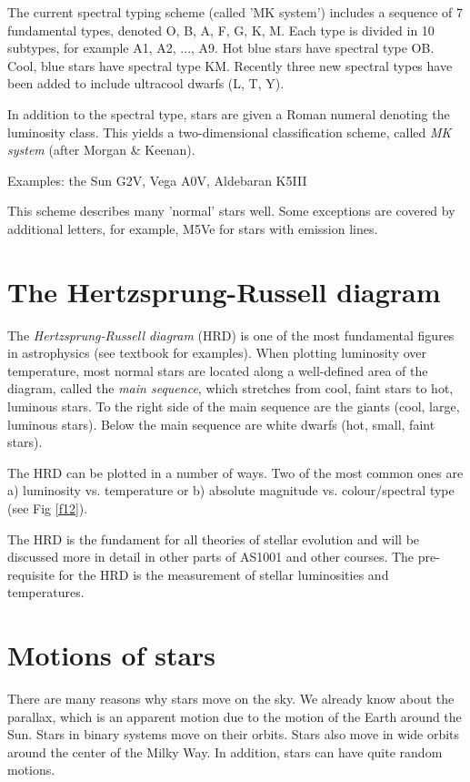 The current spectral typing scheme (called 'MK system') includes a sequence of 7 fundamental types, denoted O, B, A, F, G, K, M. Each type is divided in 10 subtypes, for example A1, A2, ..., A9. Hot blue stars have spectral type OB. Cool, blue stars have spectral type KM. Recently three new spectral types have been added to include ultracool dwarfs (L, T, Y).

In addition to the spectral type, stars are given a Roman numeral denoting the luminosity class. This yields a two-dimensional classification scheme, called \textit{MK system} (after Morgan \& Keenan). 

Examples: the Sun G2V, Vega A0V, Aldebaran K5III

This scheme describes many 'normal' stars well. Some exceptions are covered by additional letters, for example, M5Ve for stars with emission lines.

\section{The Hertzsprung-Russell diagram}

The \textit{Hertzsprung-Russell diagram} (HRD) is one of the most fundamental figures in astrophysics (see textbook for examples). When plotting luminosity over temperature, most normal stars are located along a well-defined area of the diagram, called the \textit{main sequence}, which stretches from cool, faint stars to hot, luminous stars. To the right side of the main sequence are the giants (cool, large, luminous stars). Below the main sequence are white dwarfs (hot, small, faint stars).

The HRD can be plotted in a number of ways. Two of the most common ones are a) luminosity vs. temperature or b) absolute magnitude vs. colour/spectral type (see Fig \ref{f12}).

The HRD is the fundament for all theories of stellar evolution and will be discussed more in detail in other parts of AS1001 and other courses. The pre-requisite for the HRD is the measurement of stellar luminosities and temperatures. 

\section{Motions of stars}

There are many reasons why stars move on the sky. We already know about the parallax, which is an apparent motion due to the motion of the Earth around the Sun. Stars in binary systems move on their orbits. Stars also move in wide orbits around the center of the Milky Way. In addition, stars can have quite random motions.

